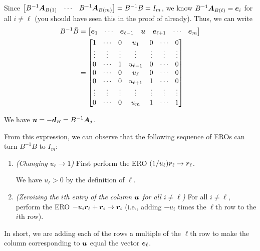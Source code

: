 \begin{enumerate}
Since \(\begin{bmatrix}B^{-1}\bm{A}_{B(1)}&\cdots&B^{-1}\bm{A}_{B(m)}\end{bmatrix}
=B^{-1}B=I_m\), we know \(B^{-1}\bm{A}_{B(\ell)}=\bm{e}_i\) for all
\(i\ne\ell\) (you should have seen this in the proof of
 already). Thus, we can write
\begin{align*}
B^{-1}\bar{B}&=\begin{bmatrix}\bm{e}_1&\cdots&\bm{e}_{\ell-1}&\bm{u}&
\bm{e}_{\ell+1}&\cdots&\bm{e}_m\end{bmatrix} \\
&=\begin{bmatrix}1&\cdots&0&u_1&0&\cdots&0 \\
\vdots&\vdots&\vdots&\vdots&\vdots&\vdots&\vdots \\
0&\cdots&1&u_{\ell-1}&0&\cdots&0 \\
0&\cdots&0&u_{\ell}&0&\cdots&0 \\
0&\cdots&0&u_{\ell+1}&1&\cdots&0 \\
\vdots&\vdots&\vdots&\vdots&\vdots&\vdots&\vdots \\
0&\cdots&0&u_{m}&1&\cdots&1
\end{bmatrix}
\end{align*}
\begin{note}
We have \(\bm{u}=-\bm{d}_{B}=B^{-1}\bm{A}_j\).
\end{note}
From this expression, we can observe that the following sequence of EROs can
turn \(B^{-1}\bar{B}\) to \(I_m\):
\begin{enumerate}[label={(\arabic*)}]
\item \emph{(Changing \(u_{\ell}\to 1\))} First perform the ERO
\((1/u_{\ell})\bm{r}_{\ell}\to\bm{r}_{\ell}\).
\begin{note}
We have \(u_{\ell}>0\) by the definition of \(\ell\).
\end{note}
\item \emph{(Zeroizing the \(i\)th entry of the column \(\bm{u}\) for all \(i\ne\ell\))}
For all \(i\ne\ell\), perform the ERO
\(-u_i\bm{r}_{\ell}+\bm{r}_{i}\to\bm{r}_{i}\) (i.e., adding
\(-u_i\) times the \(\ell\)th row to the \(i\)th row).
\end{enumerate}
In short, we are adding each of the rows a multiple of the \(\ell\)th row to
make the column corresponding to \(\bm{u}\) equal the vector \(\bm{e}_{\ell}\).


\end{enumerate}
